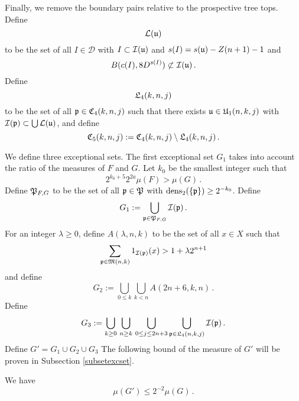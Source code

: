 Finally, we remove the boundary pairs relative to the prospective tree tops. Define
\begin{equation}
    \label{eq L def}
    \mathcal{L}(\mathfrak u)
\end{equation}
to be the set of all $I \in \mathcal{D}$ with $I \subset \mathcal{I}(\mathfrak u)$ and $s(I) = s(\mathfrak u) - Z(n+1) - 1$ and
\begin{equation}
    B(c(I), 8 D^{s(I)})\not \subset \mathcal{I}(\mathfrak u)\, .
\end{equation}
Define
\begin{equation}
    \label{eq L4 def}
    \mathfrak L_4(k,n,j)
\end{equation}
to be the set of all $\mathfrak p\in \mathfrak C_4(k,n,j)$ such that there exists
$\mathfrak u\in \mathfrak U_1(n,k,j)$
with $\mathcal{I}(\mathfrak p) \subset \bigcup \mathcal{L}(\mathfrak u)$, and define
\begin{equation}\label{defc5}
\mathfrak C_5(k,n,j):=\mathfrak C_4(k,n,j)
  \setminus \mathfrak L_4(k,n,j)\, .
\end{equation}


We define three exceptional sets.
The first exceptional set $G_1$ takes into account the ratio of the measures of $F$ and $G$.
Let $k_0$ be the smallest integer such that 
\begin{equation}
2^{k_0+5}2^{2a} \mu(F)> \mu(G)\,.
\end{equation}
Define $\mathfrak P_{F,G}$ to be the set of all $\mathfrak p\in \mathfrak P$
with $\operatorname{\operatorname{dens}}_2(\{\mathfrak p\})\ge 2^{-k_0}$. Define
\begin{equation}\label{definegone}
    G_1:=\bigcup_{\mathfrak p\in \mathfrak P_{F,G} }\mathcal{I}(\mathfrak p)\, .
\end{equation}
For an integer $\lambda\ge 0$, define  $A(\lambda,n,k)$ to be the set  of all $x\in X$ such that
\begin{equation}
    \label{eq Aoverlap def}
    \sum_{\mathfrak p \in \mathfrak{M}(n,k)}1_{\mathcal{I}(\mathfrak p)}(x)>1+\lambda 2^{n+1}
\end{equation}
and define
\begin{equation}\label{definegone2}
    G_2:=
\bigcup_{0\le  k}\bigcup_{k< n}
A(2n+6,k,n)\, .
\end{equation}
Define
    \begin{equation}\label{defineg3}
        G_3 :=
        \bigcup_{k\ge 0}\, \bigcup_{n \geq k}\,
        \bigcup_{0\le j\le 2n+3}
        \bigcup_{\mathfrak p \in \mathfrak L_4 (n,k,j)}
        \mathcal{I}(\mathfrak p)\, .
     \end{equation}
Define $G'=G_1\cup G_2 \cup G_3$
The following bound of the measure of $G'$ will be proven in
Subsection \ref{subsetexcset}.
\begin{lemma}\label{allgbound}
We have
\begin{equation}
    \mu(G')\le 2^{-2}\mu(G)\, .
\end{equation}
\end{lemma}

